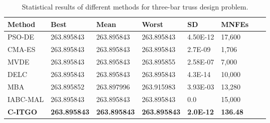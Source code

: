 
\begin{table*}[h]
    \tiny
\begin{center}

\begin{tabular}{ P{2.0cm} P{2.0cm} P{2.0cm} P{2.0cm} P{2.0cm} P{2.0cm} P{2.0cm} P{2.0cm}  }
\hline
\textbf{Method} & \textbf{Best} & \textbf{Mean} & \textbf{Worst} & \textbf{SD} & \textbf{MNFEs} \\
\hline

PSO-DE & 263.895843 & 263.895843 & 263.895843 & 4.50E-12 & 17,600 \\
CMA-ES & 263.895843 & 263.895843 & 263.895843 & 2.7E-09 & 1,706 \\
MVDE & 263.895843 & 263.895843 & 263.895855 & 2.58E-07 & 7,000 \\
DELC & 263.895843 & 263.895843 & 263.895843 & 4.3E-14 & 10,000 \\
MBA & 263.895852 & 263.897996 & 263.915983 & 3.93E-03 & 13,280 \\
IABC-MAL & 263.895843 & 263.895843 & 263.895843 & 0.0 & 15,000 \\
\textbf{C-ITGO} & \bf{263.895843} & \bf{263.895843} & \bf{263.895843} & \bf{2.0E-12} & \bf{136.48} \\


\hline
\end{tabular}
\end{center}
\vspace*{-6mm}
\caption{Statistical results of different methods for three-bar truss design problem. \\[1em]}
\label{tab:TB}
\end{table*}

